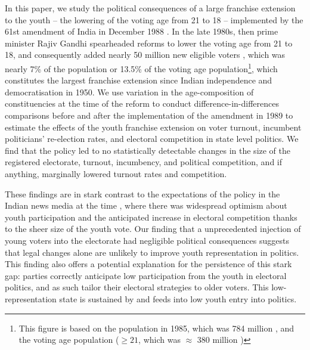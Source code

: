 In this paper, we study the political consequences of a large
franchise extension to the youth -- the lowering of the voting age
from 21 to 18 -- implemented by the 61st amendment of India in
December 1988 \parencite{sharma2021introduction}. In the late 1980s,
then prime minister Rajiv Gandhi spearheaded reforms to lower the
voting age from 21 to 18, and consequently added nearly 50 million new
eligible voters \parencite{Ani_2019,Pachauri1989-oc}, which was nearly
7\% of the population or 13.5\% of the voting age
population\footnote{This figure is based on the population in 1985,
which was 784 million \parencite{desa2015united}, and the voting age
population ($\geq 21$, which was $\approx$ 380 million
\parencite{Pachauri1989-oc})}, which constitutes the largest franchise
extension since Indian independence and democratisation in 1950. We
use variation in the age-composition of constituencies at the time of
the reform to conduct difference-in-differences comparisons before and
after the implementation of the amendment in 1989 to estimate the
effects of the youth franchise extension on voter turnout, incumbent
politicians' re-election rates, and electoral competition in state
level politics. We find that the policy led to no statistically
detectable changes in the size of the registered electorate, turnout,
incumbency, and political competition, and if anything, marginally
lowered turnout rates and competition.

These findings are in stark contrast to the expectations of the policy
in the Indian news media at the time \parencite{Pachauri1989-oc},
where there was widespread optimism about youth participation and the
anticipated increase in electoral competition thanks to the sheer size
of the youth vote. Our finding that a unprecedented injection of young
voters into the electorate had negligible political consequences
suggests that legal changes alone are unlikely to improve youth
representation in politics. This finding also offers a potential
explanation for the persistence of this stark gap: parties correctly
anticipate low participation from the youth in electoral politics, and
as such tailor their electoral strategies to older voters. This
low-representation state is sustained by and feeds into low youth
entry into politics.

